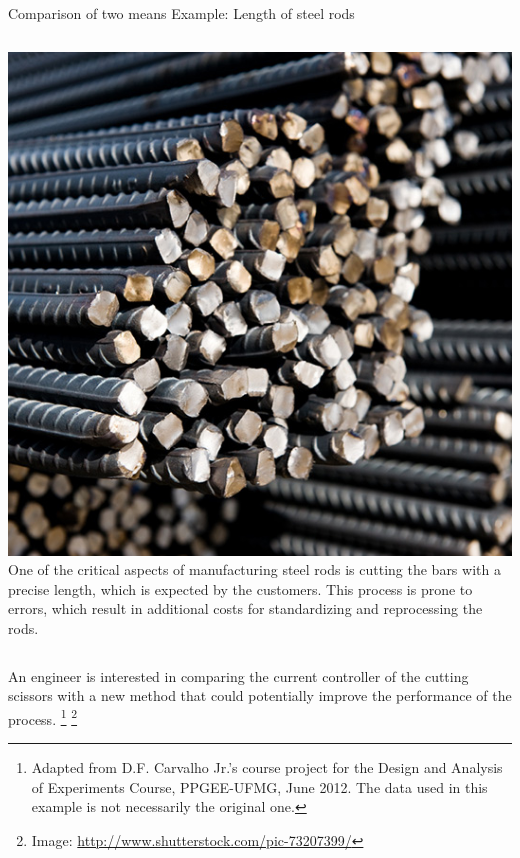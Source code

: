 \documentclass[t]{beamer}
\begin{document}
\begin{ftst}
{Comparison of two means}
{Example: Length of steel rods}
\begin{columns}
\includegraphics[width=\textwidth]{../figs/steelrods.jpg}
One of the critical aspects of manufacturing steel rods is cutting the bars with a precise length, which is expected by the customers.
\vhalf
This process is prone to errors, which result in additional costs for standardizing and reprocessing the rods.
\end{columns}
\vone
An engineer is interested in comparing the current controller of the cutting scissors with a new method that could potentially improve the performance of the process.
\let\thefootnote\relax\footnote{\tiny Adapted from D.F. Carvalho Jr.'s course project for the Design and Analysis of Experiments Course, PPGEE-UFMG, June 2012. The data used in this example is not necessarily the original one.}
\let\thefootnote\relax\footnote{\tiny Image: \url{http://www.shutterstock.com/pic-73207399/}}
\end{ftst}

\end{document}
